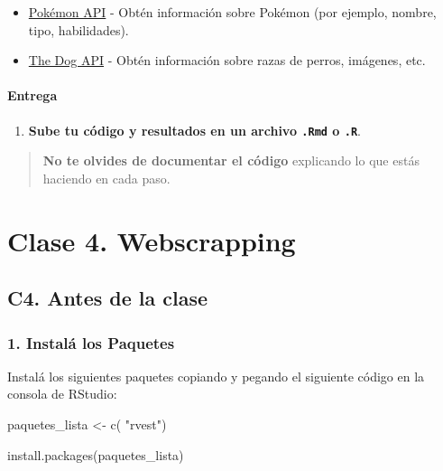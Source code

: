 \documentclass[
  letterpaper,
  DIV=11,
  numbers=noendperiod]{scrreprt}
\newenvironment{Shaded}{\begin{snugshade}}{\end{snugshade}}
\newcommand{\FunctionTok}[1]{\textcolor[rgb]{0.28,0.35,0.67}{#1}}
\newcommand{\NormalTok}[1]{\textcolor[rgb]{0.00,0.23,0.31}{#1}}
\newcommand{\OtherTok}[1]{\textcolor[rgb]{0.00,0.23,0.31}{#1}}
\newcommand{\StringTok}[1]{\textcolor[rgb]{0.13,0.47,0.30}{#1}}
\providecommand{\tightlist}{%
  \setlength{\itemsep}{0pt}\setlength{\parskip}{0pt}}
\begin{document}
\begin{itemize}
\item
  \href{https://pokeapi.co/}{Pokémon API} - Obtén información sobre
  Pokémon (por ejemplo, nombre, tipo, habilidades).
\item
  \href{https://thedogapi.com/}{The Dog API} - Obtén información sobre
  razas de perros, imágenes, etc.
\end{itemize}

\subsection{Entrega}\label{entrega}

\begin{enumerate}
\def\labelenumi{\arabic{enumi}.}
\tightlist
\item
  \textbf{Sube tu código y resultados en un archivo \texttt{.Rmd} o
  \texttt{.R}}.
\end{enumerate}

\begin{quote}
\textbf{No te olvides de documentar el código} explicando lo que estás
haciendo en cada paso.
\end{quote}

\part{\textbf{Clase 4. Webscrapping}}

\chapter{C4. Antes de la clase}\label{c4.-antes-de-la-clase}

\section{\texorpdfstring{\textbf{1. Instalá los
Paquetes}}{1. Instalá los Paquetes}}\label{instaluxe1-los-paquetes}

Instalá los siguientes paquetes copiando y pegando el siguiente código
en la consola de RStudio:

\begin{Shaded}
\begin{Highlighting}[]

\NormalTok{paquetes\_lista }\OtherTok{\textless{}{-}} \FunctionTok{c}\NormalTok{(}
  \StringTok{"rvest"}\NormalTok{)}

\FunctionTok{install.packages}\NormalTok{(paquetes\_lista)}
\end{Highlighting}
\end{Shaded}
\end{document}
